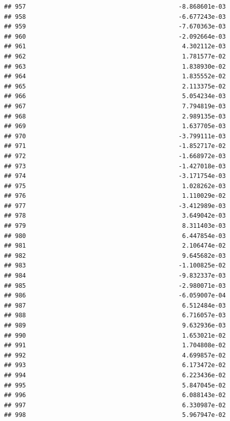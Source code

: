 \documentclass[
]{article}
\begin{document}
\begin{verbatim}
## 957                                          -8.868601e-03
## 958                                          -6.677243e-03
## 959                                          -7.670363e-03
## 960                                          -2.092664e-03
## 961                                           4.302112e-03
## 962                                           1.781577e-02
## 963                                           1.838930e-02
## 964                                           1.835552e-02
## 965                                           2.113375e-02
## 966                                           5.054234e-03
## 967                                           7.794819e-03
## 968                                           2.989135e-03
## 969                                           1.637705e-03
## 970                                          -3.799111e-03
## 971                                          -1.852717e-02
## 972                                          -1.668972e-03
## 973                                          -1.427018e-03
## 974                                          -3.171754e-03
## 975                                           1.028262e-03
## 976                                           1.110029e-02
## 977                                          -3.412989e-03
## 978                                           3.649042e-03
## 979                                           8.311403e-03
## 980                                           6.447854e-03
## 981                                           2.106474e-02
## 982                                           9.645682e-03
## 983                                          -1.100825e-02
## 984                                          -9.832337e-03
## 985                                          -2.980071e-03
## 986                                          -6.059007e-04
## 987                                           6.512484e-03
## 988                                           6.716057e-03
## 989                                           9.632936e-03
## 990                                           1.653021e-02
## 991                                           1.704808e-02
## 992                                           4.699857e-02
## 993                                           6.173472e-02
## 994                                           6.223436e-02
## 995                                           5.847045e-02
## 996                                           6.088143e-02
## 997                                           6.330987e-02
## 998                                           5.967947e-02

\end{verbatim}
\end{document}
